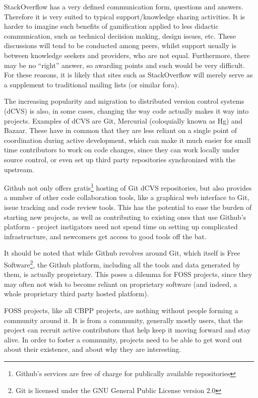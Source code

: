 \documentclass[a4paper,11pt]{article} %
\begin{document}
StackOverflow has a very defined communication form, questions and
answers. Therefore it is very suited to typical support/knowledge
sharing activities. It is harder to imagine such benefits of
gamification applied to less didactic communication, such as technical
deciision making, design issues, etc. These discussions will tend to
be conducted among peers, whilst support usually is between knowledge
seekers and providers, who are not equal. Furthermore, there may be no
``right'' answer, so awarding points and such would be very
difficult. For these reasons, it is likely that sites such as
StackOverflow will merely serve as a supplement to traditional mailing
lists (or similar fora).


The increasing popularity and migration to distributed version control
systems (dCVS) is also, in some cases, changing the way code actually
makes it way into projects. Examples of dCVS are Git, Mercurial
(coloquially known as Hg) and Bazaar. These have in common that they
are less reliant on a single point of coordination during active
development, which can make it much easier for small time contributors
to work on code changes, since they can work locally under source
control, or even set up third party repositories synchronized with the
upstream.

Github not only offers gratis\footnote{Github's services are free of
  charge for publically available repositories} hosting of Git dCVS
repositories, but also provides a number of other code collaboration
tools, like a graphical web interface to Git, issue tracking and code
review tools. This has the potential to ease the burden of starting
new projects, as well as contributing to existing ones that use
Github's platform - project instigators need not spend time on setting
up complicated infrastructure, and newcomers get access to good tools
off the bat.

It should be noted that while Github revolves around Git, which itself
is Free Software\footnote{Git is licensed under the GNU General Public
  License version 2.0}, the Github platform, including all the tools
and data generated by them, is actually proprietary. This poses a
dilemma for FOSS projects, since they may often not wish to become
reliant on proprietary software (and indeed, a whole proprietary third
party hosted platform).


FOSS projects, like all CBPP projects, are nothing without people
forming a community around it. It is from a community, generally
mostly users, that the project can recruit active contributors that
help keep it moving forward and stay alive. In order to foster a
community, projects need to be able to get word out about their
existence, and about why they are interesting.
\end{document}
